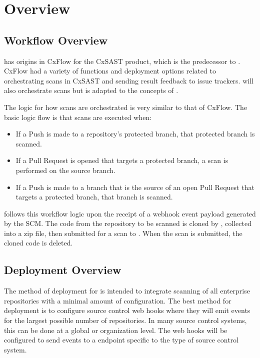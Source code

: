 \chapter{Overview}\label{sec:overview}

\section{Workflow Overview}

\cxoneflow has origins in CxFlow for the CxSAST product, which is the predecessor to \cxone.  CxFlow
had a variety of functions and deployment options related to orchestrating scans in CxSAST and sending
result feedback to issue trackers.  \cxoneflow will also orchestrate scans but is adapted to the
concepts of \cxone.

The \cxoneflow logic for how scans are orchestrated is very similar to that of CxFlow.  The basic
logic flow is that scans are executed when:

\begin{itemize}
    \item If a Push is made to a repository's protected branch, that protected branch is scanned.
    \item If a Pull Request is opened that targets a protected branch, a scan is performed on
    the source branch.
    \item If a Push is made to a branch that is the source of an open Pull Request that targets
    a protected branch, that branch is scanned.
\end{itemize}


\cxoneflow follows this workflow logic upon the receipt of a webhook event payload generated by the SCM.
The code from the repository to be scanned is cloned by \cxoneflow, collected into a zip file, then submitted
for a scan to \cxone.  When the scan is submitted, the cloned code is deleted.


\section{Deployment Overview}

The method of deployment for \cxoneflow is intended to integrate scanning of all enterprise repositories
with a minimal amount of configuration.  The best method for deployment is to configure source control web
hooks where they will emit events for the largest possible number of repositories.  In many source control
systems, this can be done at a global or organization level.  The web hooks will be configured to send events
to a \cxoneflow endpoint specific to the type of source control system.

